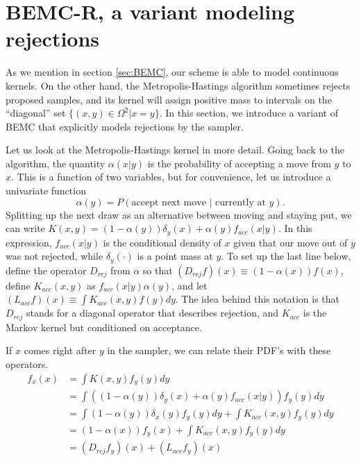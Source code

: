 \documentclass{article}
\begin{document}
\section{BEMC-R, a variant modeling rejections}
\label{sec:BEMC-R}

As we mention in section \ref{sec:BEMC}, our scheme is able to model continuous kernels. On the other hand, the Metropolis-Hastings algorithm sometimes rejects proposed samples, and its kernel will assign positive mass to intervals on the ``diagonal'' set $\{(x,y) \in \Omega^2 | x=y\}$. In this section, we introduce a variant of BEMC that explicitly models rejections by the sampler. 

Let us look at the Metropolis-Hastings kernel in more detail. Going back to the algorithm, the quantity $\alpha(x|y)$ is the probability of accepting a move from $y$ to $x$. This is a function of two variables, but for convenience, let us introduce a univariate function $$\alpha(y)=P(\text{accept next move $|$ currently at }y).$$ Splitting up the next draw as an alternative between moving and staying put, we can write $K(x, y) = (1-\alpha(y))\delta_{y}(x) + \alpha(y)f_{acc}(x|y)$. In this expression, $f_{acc}(x|y)$ is the conditional density of $x$ given that our move out of $y$ was not rejected, while $\delta_y(\cdot)$ is a point mass at $y$. %
To set up the last line below, define the operator $D_{rej}$ from $\alpha$ so that $(D_{rej}f)(x)\equiv (1-\alpha(x))f(x)$, define $K_{acc}(x,y)$ as $f_{acc}(x|y)\alpha(y)$, and let $(L_{acc}f)(x)\equiv \int K_{acc}(x,y)f(y)dy$. The idea behind this notation is that $D_{rej}$ stands for a diagonal operator that describes rejection, and $K_{acc}$ is the Markov kernel but conditioned on acceptance.

If $x$ comes right after $y$ in the sampler, we can relate their PDF's with these operators.
\begin{align*}
 f_x(x) &= \int K(x, y)f_y(y)dy \\
&= \int ((1-\alpha(y))\delta_{y}(x) + \alpha(y)f_{acc}(x|y))f_y(y)dy \\
&= \int (1-\alpha(y))\delta_{x}(y)f_y(y)dy + \int K_{acc}(x,y)f_y(y)dy \\
&=  (1-\alpha(x))f_y(x) + \int K_{acc}(x,y)f_y(y)dy \\
&=  (D_{rej}f_y)(x) + (L_{acc}f_y)(x) \\
\end{align*}
\end{document}
